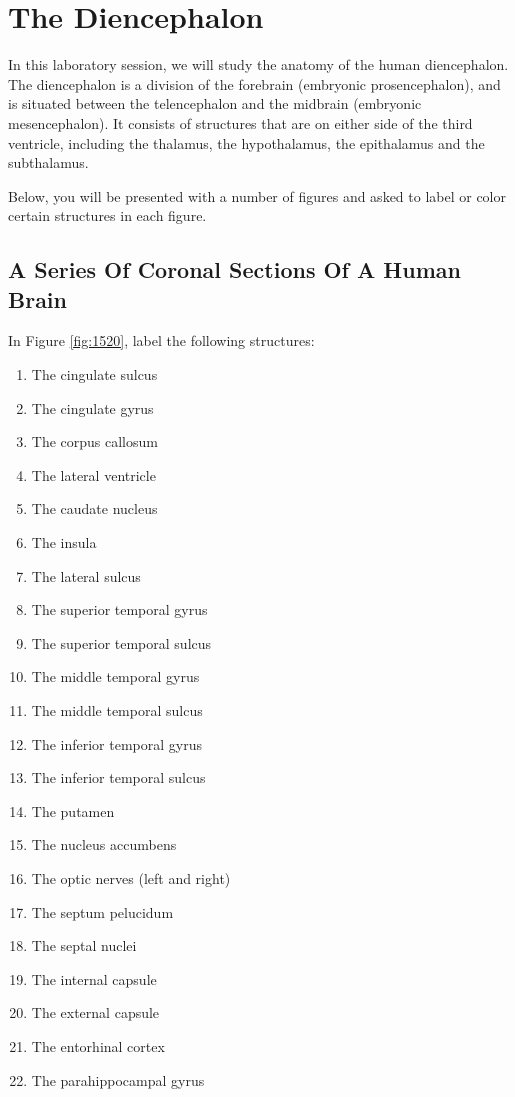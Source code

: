 \documentclass[]{book}
\providecommand{\tightlist}{%
  \setlength{\itemsep}{0pt}\setlength{\parskip}{0pt}}
\begin{document}
\hypertarget{the-diencephalon}{%
\chapter{The Diencephalon}\label{the-diencephalon}}

In this laboratory session, we will study the anatomy of the human diencephalon. The diencephalon is a division of the forebrain (embryonic prosencephalon), and is situated between the telencephalon and the midbrain (embryonic mesencephalon). It consists of structures that are on either side of the third ventricle, including the thalamus, the hypothalamus, the epithalamus and the subthalamus.

Below, you will be presented with a number of figures and asked to label or color certain structures in each figure.

\hypertarget{a-series-of-coronal-sections-of-a-human-brain-1}{%
\section{A Series Of Coronal Sections Of A Human Brain}\label{a-series-of-coronal-sections-of-a-human-brain-1}}

In Figure \ref{fig:1520}, label the following structures:

\begin{enumerate}
\def\labelenumi{\arabic{enumi}.}
\tightlist
\item
  The cingulate sulcus
\item
  The cingulate gyrus
\item
  The corpus callosum
\item
  The lateral ventricle
\item
  The caudate nucleus
\item
  The insula
\item
  The lateral sulcus
\item
  The superior temporal gyrus
\item
  The superior temporal sulcus
\item
  The middle temporal gyrus
\item
  The middle temporal sulcus
\item
  The inferior temporal gyrus
\item
  The inferior temporal sulcus
\item
  The putamen
\item
  The nucleus accumbens
\item
  The optic nerves (left and right)
\item
  The septum pelucidum
\item
  The septal nuclei
\item
  The internal capsule
\item
  The external capsule
\item
  The entorhinal cortex
\item
  The parahippocampal gyrus
\end{enumerate}
\end{document}

